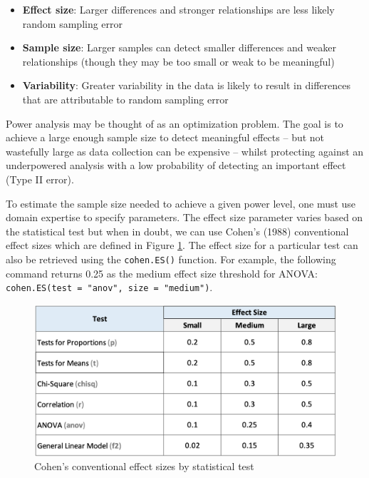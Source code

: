 \documentclass[
]{book}
\providecommand{\tightlist}{%
  \setlength{\itemsep}{0pt}\setlength{\parskip}{0pt}}
\begin{document}
\begin{itemize}
\tightlist
\item
  \textbf{Effect size}: Larger differences and stronger relationships are less likely random sampling error
\item
  \textbf{Sample size}: Larger samples can detect smaller differences and weaker relationships (though they may be too small or weak to be meaningful)
\item
  \textbf{Variability}: Greater variability in the data is likely to result in differences that are attributable to random sampling error
\end{itemize}

Power analysis may be thought of as an optimization problem. The goal is to achieve a large enough sample size to detect meaningful effects -- but not wastefully large as data collection can be expensive -- whilst protecting against an underpowered analysis with a low probability of detecting an important effect (Type II error).

To estimate the sample size needed to achieve a given power level, one must use domain expertise to specify parameters. The effect size parameter varies based on the statistical test but when in doubt, we can use Cohen's (1988) conventional effect sizes which are defined in Figure \ref{fig:conv-eff-size-tbl}. The effect size for a particular test can also be retrieved using the \texttt{cohen.ES()} function. For example, the following command returns 0.25 as the medium effect size threshold for ANOVA: \texttt{cohen.ES(test\ =\ "anov",\ size\ =\ "medium")}.

\begin{figure}

{\centering \includegraphics[width=1\linewidth]{graphics/conventional_effect_size_table} 

}

\caption{Cohen's conventional effect sizes by statistical test}\label{fig:conv-eff-size-tbl}
\end{figure}
\end{document}
